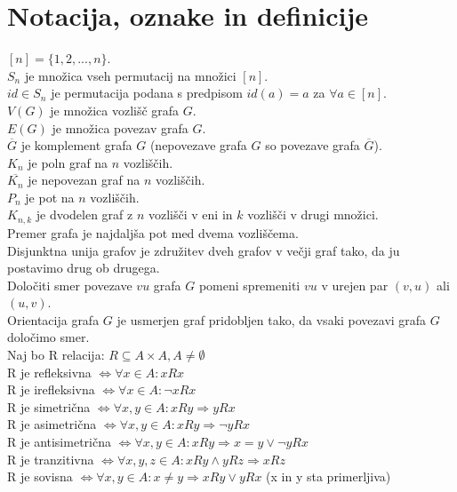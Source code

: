 \documentclass[a4paper, 12pt]{book}
\begin{document}
\section{ Notacija, oznake in definicije }
$[n] = \{ 1, 2,..., n\}$. \\
$S_n$ je množica vseh permutacij na množici $[n]$. \\
$id \in S_n$ je permutacija podana s predpisom $id(a) = a$ za $\forall a \in [n]$. \\
$V(G)$ je množica vozlišč grafa $G$. \\
$E(G)$ je množica povezav grafa $G$. \\
$\overline{G}$ je komplement grafa $G$ (nepovezave grafa $G$ so povezave grafa $\overline{G}$). \\
$K_n$ je poln graf na $n$ vozliščih. \\
$\overline{K_n}$ je nepovezan graf na $n$ vozliščih. \\
$P_n$ je pot na $n$ vozliščih. \\
$K_{n, k}$ je dvodelen graf z $n$ vozlišči v eni in $k$ vozlišči v drugi množici. \\
Premer grafa je najdaljša pot med dvema vozliščema. \\
Disjunktna unija grafov je združitev dveh grafov v večji graf tako, da ju postavimo drug ob drugega. \\
Določiti smer povezave $vu$ grafa $G$ pomeni spremeniti $vu$ v urejen par $(v, u)$ ali $(u, v)$. \\
Orientacija grafa $G$ je usmerjen graf pridobljen tako, da vsaki povezavi grafa $G$ določimo smer. \\
Naj bo R relacija: $ R\subseteq A\times A, A\neq\emptyset$ \\
R je refleksivna $\Leftrightarrow \forall x\in A: xRx$ \\
R je irefleksivna $\Leftrightarrow \forall x\in A: \neg xRx$ \\
R je simetrična $\Leftrightarrow \forall x,y\in A: xRy \Rightarrow yRx$ \\
R je asimetrična $\Leftrightarrow \forall x,y\in A: xRy \Rightarrow \neg yRx$ \\
R je antisimetrična $\Leftrightarrow \forall x,y\in A: xRy \Rightarrow x = y \lor \neg yRx$\\
R je tranzitivna $\Leftrightarrow \forall x,y,z\in A: xRy \land yRz \Rightarrow xRz$ \\
R je sovisna $\Leftrightarrow \forall x,y\in A: x \neq y \Rightarrow xRy \lor yRx $ (x in y sta primerljiva)\\
\end{document}
